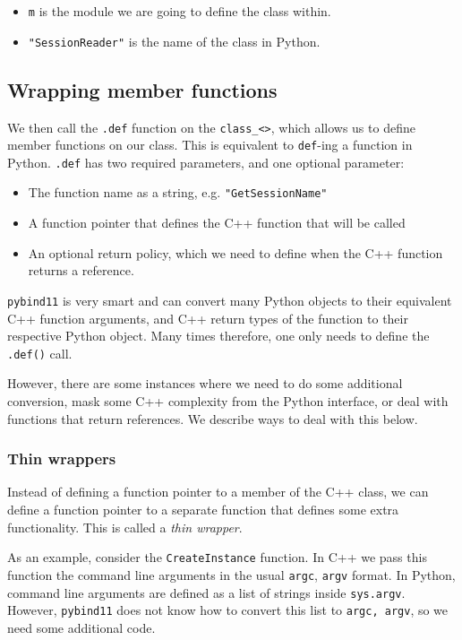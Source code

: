 \begin{itemize}
  \item \texttt{m} is the module we are going to define the class within.
  \item \texttt{"SessionReader"} is the name of the class in Python.
\end{itemize}

\subsection{Wrapping member functions}

We then call the \texttt{.def} function on the \texttt{class\_<>}, which allows
us to define member functions on our class. This is equivalent to
\texttt{def}-ing a function in Python. \texttt{.def} has two required
parameters, and one optional parameter:

\begin{itemize}
  \item The function name as a string, e.g. \texttt{"GetSessionName"}
  \item A function pointer that defines the C++ function that will be called
  \item An optional return policy, which we need to define when the C++ function
  returns a reference.
\end{itemize}

\texttt{pybind11} is very smart and can convert many Python objects to their
equivalent C++ function arguments, and C++ return types of the function to their
respective Python object. Many times therefore, one only needs to define the
\texttt{.def()} call.

However, there are some instances where we need to do some additional
conversion, mask some C++ complexity from the Python interface, or deal with
functions that return references. We describe ways to deal with this below.

\subsubsection{Thin wrappers}

Instead of defining a function pointer to a member of the C++ class, we can
define a function pointer to a separate function that defines some extra
functionality. This is called a \emph{thin wrapper}.

As an example, consider the \texttt{CreateInstance} function. In C++ we pass
this function the command line arguments in the usual \texttt{argc},
\texttt{argv} format. In Python, command line arguments are defined as a list of
strings inside \texttt{sys.argv}. However, \texttt{pybind11} does not know how to
convert this list to \texttt{argc, argv}, so we need some additional code.

